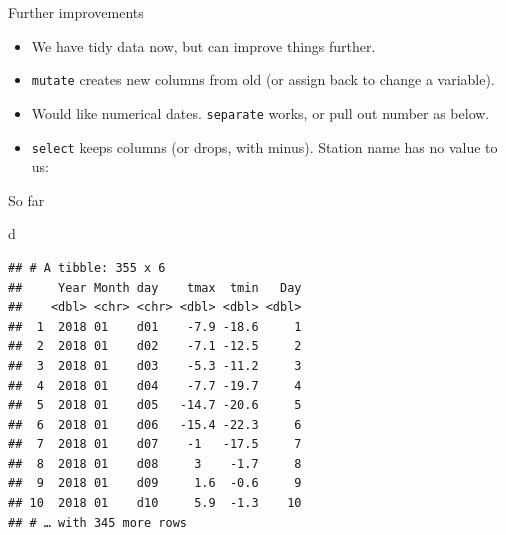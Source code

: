 \documentclass[ignorenonframetext,]{beamer}
\newenvironment{Shaded}{\begin{snugshade}}{\end{snugshade}}
\newcommand{\DataTypeTok}[1]{\textcolor[rgb]{0.13,0.29,0.53}{#1}}
\newcommand{\KeywordTok}[1]{\textcolor[rgb]{0.13,0.29,0.53}{\textbf{#1}}}
\newcommand{\NormalTok}[1]{#1}
\newcommand{\OperatorTok}[1]{\textcolor[rgb]{0.81,0.36,0.00}{\textbf{#1}}}
\newcommand{\StringTok}[1]{\textcolor[rgb]{0.31,0.60,0.02}{#1}}
\providecommand{\tightlist}{%
  \setlength{\itemsep}{0pt}\setlength{\parskip}{0pt}}
\begin{document}
\begin{frame}[fragile]{Further improvements}
\protect\hypertarget{further-improvements}{}

\begin{itemize}
\tightlist
\item
  We have tidy data now, but can improve things further.
\item
  \texttt{mutate} creates new columns from old (or assign back to change
  a variable).
\item
  Would like numerical dates. \texttt{separate} works, or pull out
  number as below.
\item
  \texttt{select} keeps columns (or drops, with minus). Station name has
  no value to us:
\end{itemize}

\small

\begin{Shaded}
\end{Shaded}

\normalsize

\end{frame}

\begin{frame}[fragile]{So far}
\protect\hypertarget{so-far-2}{}

\begin{Shaded}
\begin{Highlighting}[]
\NormalTok{d}
\end{Highlighting}
\end{Shaded}

\begin{verbatim}
## # A tibble: 355 x 6
##     Year Month day    tmax  tmin   Day
##    <dbl> <chr> <chr> <dbl> <dbl> <dbl>
##  1  2018 01    d01    -7.9 -18.6     1
##  2  2018 01    d02    -7.1 -12.5     2
##  3  2018 01    d03    -5.3 -11.2     3
##  4  2018 01    d04    -7.7 -19.7     4
##  5  2018 01    d05   -14.7 -20.6     5
##  6  2018 01    d06   -15.4 -22.3     6
##  7  2018 01    d07    -1   -17.5     7
##  8  2018 01    d08     3    -1.7     8
##  9  2018 01    d09     1.6  -0.6     9
## 10  2018 01    d10     5.9  -1.3    10
## # … with 345 more rows
\end{verbatim}

\end{frame}
\end{document}
